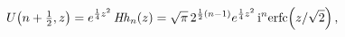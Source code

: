 \[\mathop{U\/}\nolimits\!\left(n+\tfrac{1}{2},z\right)=e^{\frac{1}{4}z^{2}}%
\mathop{\mathit{Hh}_{n}\/}\nolimits\!\left(z\right)=\sqrt{\pi}\,2^{\frac{1}{2}%
(n-1)}e^{\frac{1}{4}z^{2}}\mathop{\mathrm{i}^{n}\mathrm{erfc}\/}\nolimits\!%
\left(z/\sqrt{2}\right),\]